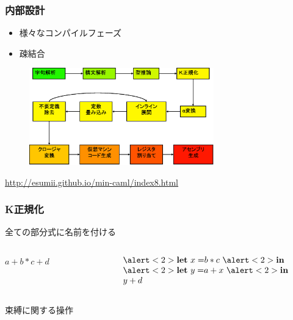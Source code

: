 \documentclass[dvipdfmx,cjk,xcolor=dvipsnames,envcountsect,notheorems,12pt]{beamer}
\theoremstyle{definition}
\newcommand{\keyword}[1]{\mathbf{#1}}
\newcommand{\LET}{\keyword{let}}
\newcommand{\IN}{\keyword{in}}
\begin{document}
\begin{frame}
	\frametitle{内部設計}
	\begin{itemize}
		\item 様々なコンパイルフェーズ
		\item 疎結合
	\end{itemize}

	\begin{figure}[htb]
		\centering
		\includegraphics[width=8cm,clip]{mincaml.eps}
	\end{figure}
	{\footnotesize \url{http://esumii.github.io/min-caml/index8.html}}
\end{frame}

\begin{frame}
	\frametitle{K正規化}
	\LARGE
	全ての部分式に名前を付ける

	\begin{columns}
		\begin{column}{0.5\textwidth}
			\begin{center}
				$a+b*c+d$
			\end{center}
		\end{column}
		\begin{column}{0.5\textwidth}
			\begin{center}
				\[
					\begin{array}{l}
						\alert<2>{\LET~x =} b * c~\alert<2>{\IN} \\
						\alert<2>{\LET~y =} a + x~\alert<2>{\IN} \\
						y + d
					\end{array}
				\]
			\end{center}
		\end{column}
	\end{columns}

	\vfill

	\alert<2>{束縛に関する操作}
	\pause
\end{frame}
\end{document}
